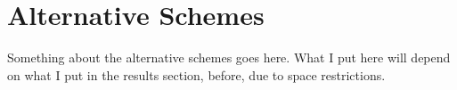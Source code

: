 \section{Alternative Schemes}
\label{sec:Alternative_Schemes}


Something about the alternative schemes goes here. What I put here will depend on what I put in the results section, before, due to space restrictions.